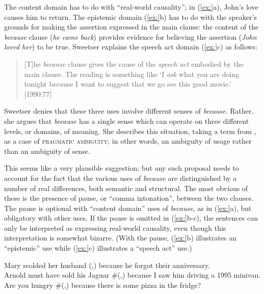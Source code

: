The content domain has to do with “real-world causality”; in (\ref{ex:}a), John’s love causes him to return. The epistemic domain (\ref{ex:}b) has to do with the speaker’s grounds for making the assertion expressed in the main clause: the content of the \textit{because} clause (\textit{he came back}) provides evidence for believing the assertion (\textit{John loved her}) to be true. Sweetser explains the speech act domain (\ref{ex:}c) as follows:


\begin{quote}
{}[T]he \textit{because} clause gives the cause of the \textit{speech act} embodied by the main clause. The reading is something like ‘I \textit{ask} what you are doing tonight because I want to suggest that we go see this good movie.’ [1990:77]
\end{quote}


Sweetser denies that these three uses involve different senses of \textit{because}. Rather, she argues that \textit{because} has a single sense which can operate on three different levels, or domains, of meaning. She describes this situation, taking a term from \citet{Horn1985}, as a case of \textsc{pragmatic ambiguity}; in other words, an ambiguity of usage rather than an ambiguity of sense.



This seems like a very plausible suggestion; but any such proposal needs to account for the fact that the various uses of \textit{because} are distinguished by a number of real differences, both semantic and structural. The most obvious of these is the presence of pause, or “comma intonation”, between the two clauses. The pause is optional with “content domain” uses of \textit{because}, as in (\ref{ex:}a), but obligatory with other uses. If the pause is omitted in (\ref{ex:}b-c), the sentences can only be interpreted as expressing real-world causality, even though this interpretation is somewhat bizarre. (With the pause, (\ref{ex:}b) illustrates an “epistemic” use while (\ref{ex:}c) illustrates a “speech act” use.)


\ea
\ea Mary scolded her husband (,) because he forgot their anniversary.\\
\ex Arnold must have sold his Jaguar \#(,) because I saw him driving a 1995 minivan.\\
\ex Are you hungry \#(,) because there is some pizza in the fridge?
                       \z
\z


